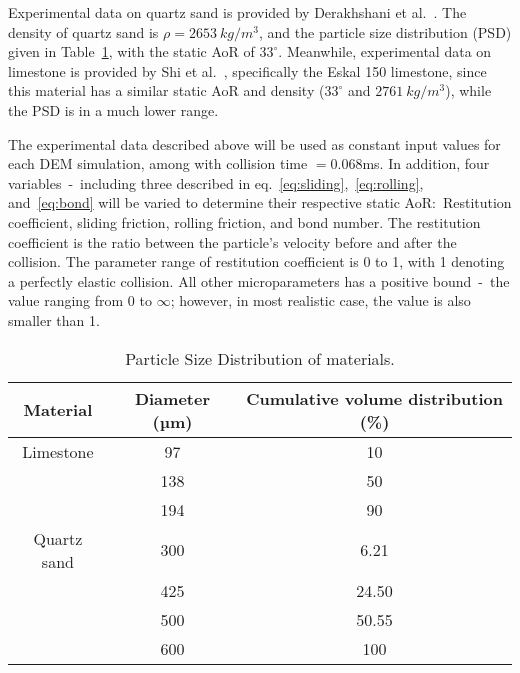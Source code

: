 Experimental data on quartz sand is provided by Derakhshani et al.~\cite{DERAKHSHANI2015127}. The density of quartz sand is $\rho = 2653~kg/m^3$, and the particle size distribution (PSD) given in Table~\ref{table:psd}, with the static AoR of $33^{\circ}$. Meanwhile, experimental data on limestone is provided by Shi et al.~\cite{SHI2020183}, specifically the Eskal 150 limestone, since this material has a similar static AoR and density ($33^{\circ}$ and $2761~kg/m^3$), while the PSD is in a much lower range. 

The experimental data described above will be used as constant input values for each DEM simulation, among with collision time $ = 0.068$ms. In addition, four variables~-~including three described in eq.~\ref{eq:sliding},~\ref{eq:rolling}, and~\ref{eq:bond} will be varied to determine their respective static AoR:~Restitution coefficient, sliding friction, rolling friction, and bond number. The restitution coefficient is the ratio between the particle's velocity before and after the collision. The parameter range of restitution coefficient is 0 to 1, with 1 denoting a perfectly elastic collision. All other microparameters has a positive bound~-~the value ranging from 0 to $\infty$; however, in most realistic case, the value is also smaller than 1. 

\begin{table}[H]
    \centering
    \begin{tabular}{c|cc}
    Material & Diameter (µm) & Cumulative volume distribution (\%) \\ \hline
    Limestone & 97 & 10 \\
     & 138 & 50 \\
     & 194 & 90 \\ \hline
    Quartz sand & 300 & 6.21 \\
     & 425 & 24.50 \\
     & 500 & 50.55 \\
     & 600 & 100
    \end{tabular}
    \caption{Particle Size Distribution of materials.}\label{table:psd}
\end{table}
        



